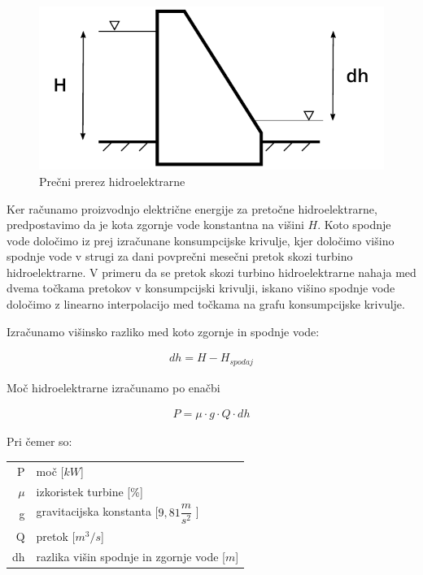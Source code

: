 \begin{figure}[ht!]
	\begin{centering}
		\includegraphics{slike/electricityProduction/powerplant_crossSection.pdf}
		\caption{Prečni prerez hidroelektrarne}
	\end{centering}
\end{figure}

Ker računamo proizvodnjo električne energije za pretočne hidroelektrarne, predpostavimo da je kota zgornje vode konstantna na višini $H$. Koto spodnje vode določimo iz prej izračunane konsumpcijske krivulje, kjer določimo višino spodnje vode v strugi za dani povprečni mesečni pretok skozi turbino hidroelektrarne. V primeru da se pretok skozi turbino hidroelektrarne nahaja med dvema točkama pretokov v konsumpcijski krivulji, iskano višino spodnje vode določimo z linearno interpolacijo med točkama na grafu konsumpcijske krivulje.

Izračunamo višinsko razliko med koto zgornje in spodnje vode:

\begin{ceqn}
\begin{align}
dh = H - H_{spodaj}
\end{align}
\end{ceqn}

Moč hidroelektrarne izračunamo po enačbi

\begin{ceqn}
\begin{align}
P = \mu \cdot g \cdot Q \cdot dh
\end{align}
\end{ceqn}

Pri čemer so:
\begin{table}[htb!]
	\begin{tabular}{r|p{10cm}}
		P & moč [$kW$]\\
		$\mu$ & izkoristek turbine [\%]\\
		g & gravitacijska konstanta [$9,81\dfrac{m}{s^{2}}$ ] \\
		Q & pretok [$m^{3}/s$]\\
		dh & razlika višin spodnje in zgornje vode [$m$]
	\end{tabular}
\end{table}


